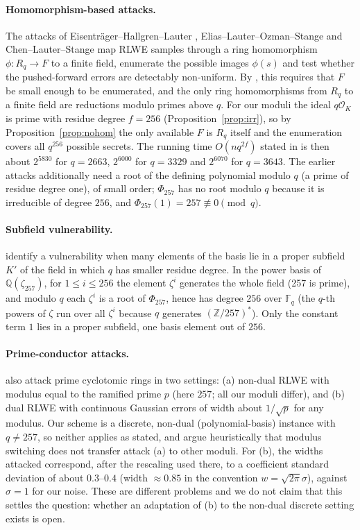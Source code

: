 \documentclass[11pt]{article}
\theoremstyle{remark}
\newcommand{\Z}{\mathbb{Z}}
\newcommand{\F}{\mathbb{F}}
\newcommand{\Rq}{R_q}
\begin{document}
\paragraph{Homomorphism-based attacks.} The attacks of Eisentr\"ager--Hallgren--Lauter \cite{EHL14}, Elias--Lauter--Ozman--Stange \cite{ELOS15} and Chen--Lauter--Stange \cite{CLS17} map RLWE samples through a ring homomorphism $\phi:\Rq\to F$ to a finite field, enumerate the possible images $\phi(s)$ and test whether the pushed-forward errors are detectably non-uniform. By \cite{CLS17}, this requires that $F$ be small enough to be enumerated, and the only ring homomorphisms from $\Rq$ to a finite field are reductions modulo primes above $q$. For our moduli the ideal $q\mathcal{O}_K$ is prime with residue degree $f=256$ (Proposition~\ref{prop:irr}), so by Proposition~\ref{prop:nohom} the only available $F$ is $\Rq$ itself and the enumeration covers all $q^{256}$ possible secrets. The running time $O(nq^{2f})$ stated in \cite{CLS17} is then about $2^{5830}$ for $q=2663$, $2^{6000}$ for $q=3329$ and $2^{6070}$ for $q=3643$. The earlier attacks \cite{EHL14,ELOS15} additionally need a root of the defining polynomial modulo $q$ (a prime of residue degree one), of small order; $\Phi_{257}$ has no root modulo $q$ because it is irreducible of degree $256$, and $\Phi_{257}(1)=257\not\equiv0\pmod q$.

\paragraph{Subfield vulnerability.} \cite{CLS17} identify a vulnerability when many elements of the basis lie in a proper subfield $K'$ of the field in which $q$ has smaller residue degree. In the power basis of $\mathbb{Q}(\zeta_{257})$, for $1\le i\le256$ the element $\zeta^i$ generates the whole field (257 is prime), and modulo $q$ each $\zeta^i$ is a root of $\Phi_{257}$, hence has degree $256$ over $\F_q$ (the $q$-th powers of $\zeta$ run over all $\zeta^i$ because $q$ generates $(\Z/257)^{*}$). Only the constant term $1$ lies in a proper subfield, one basis element out of $256$.

\paragraph{Prime-conductor attacks.} \cite{CLS17} also attack prime cyclotomic rings in two settings: (a) non-dual RLWE with modulus equal to the ramified prime $p$ (here $257$; all our moduli differ), and (b) dual RLWE with continuous Gaussian errors of width about $1/\sqrt p$ for any modulus. Our scheme is a discrete, non-dual (polynomial-basis) instance with $q\ne257$, so neither applies as stated, and \cite{CLS17} argue heuristically that modulus switching does not transfer attack (a) to other moduli. For (b), the widths attacked correspond, after the rescaling used there, to a coefficient standard deviation of about $0.3$--$0.4$ (width $\approx0.85$ in the convention $w=\sqrt{2\pi}\sigma$), against $\sigma=1$ for our noise. These are different problems and we do not claim that this settles the question: whether an adaptation of (b) to the non-dual discrete setting exists is open.
\end{document}
